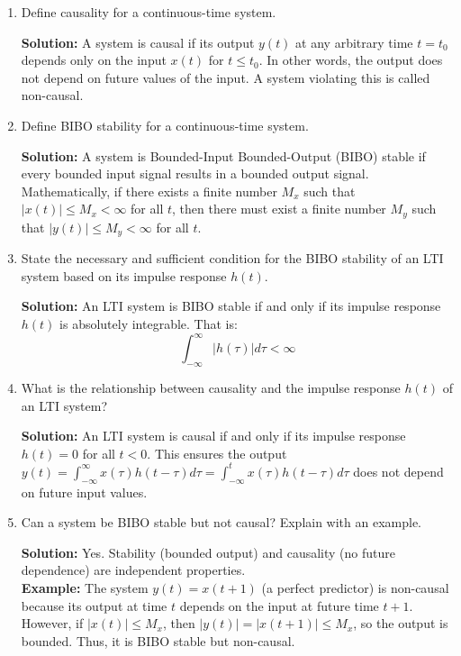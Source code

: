 \documentclass[nohyper,nobib,xcolor=dvipsnames,svgnames,x11names]{tufte-book}
\begin{document}
\begin{enumerate}


\item Define causality for a continuous-time system.

\textbf{Solution:} A system is causal if its output $ y(t) $ at any arbitrary time $ t = t_0 $ depends only on the input $ x(t) $ for $ t \leq t_0 $. In other words, the output does not depend on future values of the input. A system violating this is called non-causal.

\item Define BIBO stability for a continuous-time system.

\textbf{Solution:} A system is Bounded-Input Bounded-Output (BIBO) stable if every bounded input signal results in a bounded output signal. Mathematically, if there exists a finite number $ M_x $ such that $ |x(t)| \leq M_x < \infty $ for all $ t $, then there must exist a finite number $ M_y $ such that $ |y(t)| \leq M_y < \infty $ for all $ t $.

\item State the necessary and sufficient condition for the BIBO stability of an LTI system based on its impulse response $ h(t) $. 

\textbf{Solution:} An LTI system is BIBO stable if and only if its impulse response $ h(t) $ is absolutely integrable. That is:
$$
\int_{-\infty}^{\infty} |h(\tau)|  d\tau < \infty
$$

\item What is the relationship between causality and the impulse response $ h(t) $ of an LTI system?

\textbf{Solution:} An LTI system is causal if and only if its impulse response $ h(t) = 0 $ for all $ t < 0 $. This ensures the output $ y(t) = \int_{-\infty}^{\infty} x(\tau)h(t-\tau)d\tau = \int_{-\infty}^{t} x(\tau)h(t-\tau)d\tau $ does not depend on future input values.

\item  Can a system be BIBO stable but not causal? Explain with an example.

\textbf{Solution:} Yes. Stability (bounded output) and causality (no future dependence) are independent properties. \\

\textbf{Example:} The system $ y(t) = x(t + 1) $ (a perfect predictor) is non-causal because its output at time $ t $ depends on the input at future time $ t+1 $. However, if $ |x(t)| \leq M_x $, then $ |y(t)| = |x(t+1)| \leq M_x $, so the output is bounded. Thus, it is BIBO stable but non-causal.



\end{enumerate}
\end{document}
